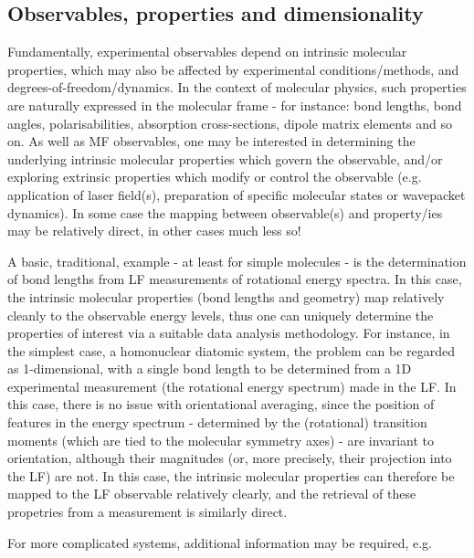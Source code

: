 \subsection{Observables, properties and dimensionality}

Fundamentally, experimental observables depend on intrinsic molecular properties, which may also be affected by experimental conditions/methods, and degrees-of-freedom/dynamics. In the  context of molecular physics, such properties are naturally expressed in the molecular frame - for instance: bond lengths, bond angles, polarisabilities, absorption cross-sections, dipole matrix elements and so on. As well as MF observables, one may be interested in determining the underlying intrinsic molecular properties which govern the observable, and/or exploring extrinsic properties which modify or control the observable (e.g. application of laser field(s), preparation of specific molecular states or wavepacket dynamics). In some case the mapping between observable(s) and property/ies may be relatively direct, in other cases much less so!

A basic, traditional, example - at least for simple molecules - is the determination of bond lengths from LF measurements of rotational energy spectra. In this case, the intrinsic molecular properties (bond lengths and geometry) map relatively cleanly to the observable energy levels, thus one can uniquely determine the properties of interest via a suitable data analysis methodology. For instance, in the simplest case, a homonuclear diatomic system, the problem can be regarded as 1-dimensional, with a single bond length to be determined from a 1D experimental measurement (the rotational energy spectrum) made in the LF. In this case, there is no issue with orientational averaging, since the position of features in the energy spectrum - determined by the (rotational) transition moments (which are tied to the molecular symmetry axes) - are invariant to orientation, although their magnitudes (or, more precisely, their projection into the LF) are not. In this case, the intrinsic molecular properties can therefore be mapped to the LF observable relatively clearly, and the retrieval of these propetries from a measurement is similarly direct.

For more complicated systems, additional information may be required, e.g.

